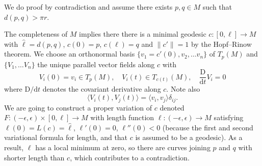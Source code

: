 \documentclass[letter-paper]{tufte-book}
\newenvironment{proof}[1][Proof]{\begin{trivlist}
\item[\hskip \labelsep {\bfseries #1}]}{\end{trivlist}}
\begin{document}
\begin{proof}
  We do proof by contradiction and assume there exists $p,q \in M$ such that $d(p,q) > \pi r$. 
  
  The completeness of $M$ implies there there is a minimal geodesic $c:[0,\ell] \to M$ with $\hat{\ell} = d(p,q)$, $c(0) = p$, $c(\ell)=q$ and $\|c'\|=1$ by the Hopf--Rinow theorem. We choose an orthonormal basis $\{v_1 = c'(0), v_2, \ldots v_n\}$ of $T_p(M)$ and $\{V_1, \ldots V_n\}$ the unique parallel vector fields along $c$ with
  \begin{equation*}
    V_i(0) = v_i \in T_p(M), \quad V_i(t) \in T_{c(t)}(M), \quad \frac{\mathrm{D}}{\mathrm{d}t} V_i = 0
  \end{equation*}
  where $\mathrm{D}/\mathrm{d}t$ denotes the covariant derivative along $c$. Note also
  \begin{equation*}
    \langle V_i(t), V_j(t)\rangle = \langle v_i, v_j\rangle \delta_{ij}.
  \end{equation*}
  We are going to construct a proper variation of $c$ denoted $F:(-\epsilon, \epsilon) \times [0, \ell] \to M$ with length function $\ell:(-\epsilon, \epsilon) \to M$ satisfying $\ell(0) = L(c) = \hat{\ell}$, $\ell'(0) = 0$, $\ell''(0) < 0$ (because the first and second variational formula for length, and that $c$ is assumed to be a geodesic). As a result, $\ell$ has a local minimum at zero, so there are curves joining $p$ and $q$ with shorter length than $c$, which contributes to a contradiction.
  

\end{proof}
\end{document}
